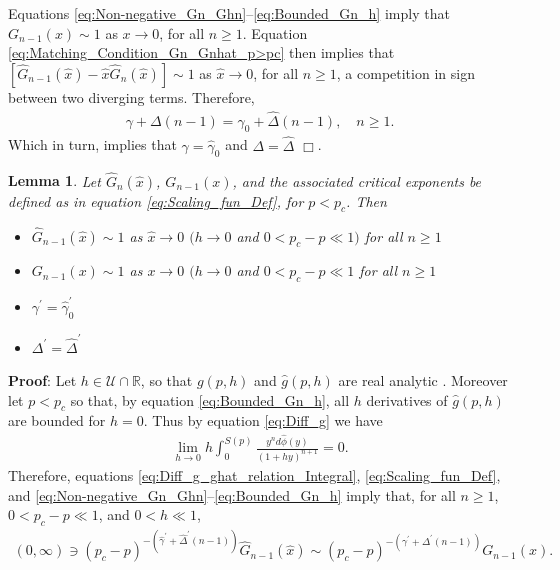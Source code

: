 \documentclass[english,12pt,jmp,graphicx]{revtex4-1}
\newtheorem{lemma}{Lemma}[section]
\newcommand{\ph}{\hat{\phi}}
\newcommand{\gh}{\hat{\gamma}}
\newcommand{\Dh}{\hat{\Delta}}
\newcommand{\xh}{\hat{x}}
\begin{document}
%
Equations \eqref{eq:Non-negative_Gn_Ghn}--\eqref{eq:Bounded_Gn_h}
imply that $G_{n-1}(x)\sim1$ as $x\to0$, for all $n\geq1$. Equation
\eqref{eq:Matching_Condition_Gn_Gnhat_p>pc} then implies that 
$[\hat{G}_{n-1}(\xh)-\xh\hat{G}_n(\xh)]\sim1$ as $\xh\to0$,
for all $n\geq1$, a competition in sign between two diverging
terms. %
Therefore, 
%
\begin{align}
  \gamma+\Delta(n-1)=\gh_0+\Dh(n-1), \quad n\geq1.
\end{align}
%
Which in turn, implies that $\gamma=\gh_0$ and $\Delta=\Dh$ $\Box$.
%
%
 \begin{lemma}\label{lem:asymp_Scaling_funs_x_to_0_p<pc}
   Let $\hat{G}_n(\xh)$, $G_{n-1}(x)$, and the associated critical
   exponents be defined as in equation \eqref{eq:Scaling_fun_Def}, for
   $p<p_c$. Then
     \begin{itemize}
    \item[1)] $\hat{G}_{n-1}(\xh)\sim1$ as $\xh\to0$ $(h\to0$ and $0<p_c-p\ll1)$
      for all $n\geq1$ 
    \item[2)] $G_{n-1}(x)\sim1$ as $x\to0$ $(h\to0$ and $0<p_c-p\ll1$ for all $n\geq1$
    \item[3)] $\gamma^\prime=\gh_0^\prime$  
    \item[4)] $\Delta^\prime=\Dh^\prime$    
     \end{itemize}
 \end{lemma}
%
\noindent \textbf{Proof}:
%
Let $h\in\mathcal{U}\cap\mathbb{R}$, so that $g(p,h)$ and $\hat{g}(p,h)$ are
real analytic \cite{Golden:CMP-473}. Moreover let $p<p_c$ so that, by
equation \eqref{eq:Bounded_Gn_h}, all $h$ derivatives of
$\hat{g}(p,h)$ are bounded for $h=0$. Thus by equation
\eqref{eq:Diff_g} we have   
%
\begin{align*}
  \lim_{h\to0}h \int_0^{S(p)}\frac{y^nd\ph(y)}{(1+hy)^{n+1}}=0.
\end{align*}
%
Therefore, equations \eqref{eq:Diff_g_ghat_relation_Integral}, 
\eqref{eq:Scaling_fun_Def}, and
\eqref{eq:Non-negative_Gn_Ghn}--\eqref{eq:Bounded_Gn_h} imply that,
for all $n\geq1$, $0<p_c-p\ll1$, and $0<h\ll1$,  
%
\begin{align}\label{eq:Matching_Condition_Gn_Gnhat_p<pc}
  (0,\infty)\ni(p_c-p)^{-(\gh^\prime+\Dh^\prime(n-1))}\hat{G}_{n-1}(\xh)
       \sim(p_c-p)^{-(\gamma^\prime+\Delta^\prime(n-1))}G_{n-1}(x).
\end{align}
\end{document}
